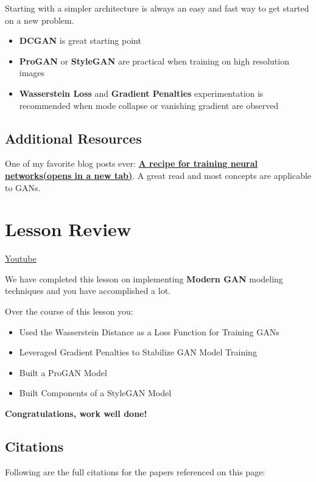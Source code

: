 Starting with a simpler architecture is always an easy and fast way to get started on a new problem.
\begin{itemize}
    \item \textbf{DCGAN} is great starting point
    \item \textbf{ProGAN} or \textbf{StyleGAN} are practical when training on high resolution images
    \item \textbf{Wasserstein Loss} and \textbf{Gradient Penalties} experimentation is recommended when mode collapse or vanishing gradient are observed
\end{itemize}

\subsection{Additional Resources}
One of my favorite blog posts ever: \href{http://karpathy.github.io/2019/04/25/recipe/}{\textbf{A recipe for training neural networks(opens in a new tab)}}. A great read and most concepts are applicable to GANs.

\section{Lesson Review}
\href{https://www.youtube.com/watch?v=sX7084PStFk}{Youtube} \newline

We have completed this lesson on implementing \textbf{Modern GAN} modeling techniques and you have accomplished a lot. \newline

Over the course of this lesson you:
\begin{itemize}
    \item Used the Wasserstein Distance as a Loss Function for Training GANs
    \item Leveraged Gradient Penalties to Stabilize GAN Model Training
    \item Built a ProGAN Model
    \item Built Components of a StyleGAN Model
\end{itemize}
\textbf{Congratulations, work well done!}

\subsection{Citations}
Following are the full citations for the papers referenced on this page:

